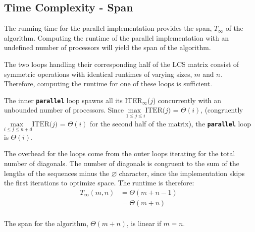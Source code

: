 \documentclass[usletter, 11pt]{extarticle}
\begin{document}
        \subsection{Time Complexity - Span} The running time for the parallel
        implementation provides the span, $T_{\infty}$ of the algorithm.
        Computing the runtime of the parallel implementation with an undefined
        number of processors will yield the span of the algorithm.

        The two loops handling their corresponding half of the LCS matrix
        consist of symmetric operations with identical runtimes of varying
        sizes, $m$ and $n$. Therefore, computing the runtime for one of these
        loops is sufficient.

        The inner \texttt{\textbf{parallel}} loop spawns all
        its ITER$_\infty$($j$) concurrently with an unbounded number of
        processors. Since $\underset{1 \le j \le i}{\text{max
        }}\text{ITER($j$)}$ = $\Theta(i)$, (congruently $\underset{i \le j \le
        n+d}{\text{max }}\text{ITER($j$)}$ = $\Theta(i)$ for the second
        half of the matrix), the \texttt{\textbf{parallel}} loop is
        $\Theta(i)$.

        The overhead for the loops come from the outer loops iterating for the
        total number of diagonals. The number of diagonals is congruent to the
        sum of the lengths of the sequences minus the $\varnothing$ character,
        since the implementation skips the first iterations to optimize space.
        The runtime is therefore:
        \begin{equation*}
            \begin{split}
                T_\infty(m, n) & = \Theta(m+n-1) \\
                & = \Theta(m+n) \\
            \end{split}
        \end{equation*}

        The span for the algorithm, $\Theta(m+n)$, is linear if $m = n$.
\end{document}
